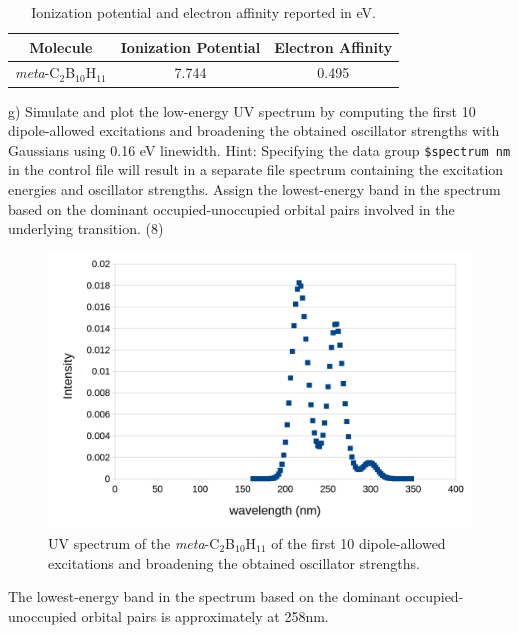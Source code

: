 \documentclass{article}
\begin{document}
\begin{table}[H]
  \centering
  \caption{Ionization potential and electron affinity
    reported in eV.}
  \begin{tabular}{ccc}
    Molecule & Ionization Potential & Electron Affinity \\
    \hline
    \textit{meta}-C$_2$B$_{10}$H$_{11}$ & 7.744 & 0.495 \\
  \end{tabular}
  \label{tab:ip_affinity}
\end{table}


\noindent g) Simulate and plot the low-energy UV spectrum by computing the
first 10 dipole-allowed excitations and broadening the obtained oscillator
strengths with Gaussians using 0.16 eV linewidth. Hint: Specifying the data
group \texttt{\$spectrum nm} in the control file will result in a separate file spectrum
containing the excitation energies and oscillator strengths. Assign the
lowest-energy band in the spectrum based on the dominant occupied-unoccupied
orbital pairs involved in the underlying transition. (8)

\begin{figure}[H]
  \centering
  \includegraphics[scale=0.5]{uv_spec.png}
  \caption{UV spectrum of the \textit{meta}-C$_2$B$_{10}$H$_{11}$ of the
    first 10 dipole-allowed excitations and broadening the obtained oscillator
    strengths.}
  \label{fig:spec}
\end{figure}

{\color{blue} The lowest-energy band in the spectrum based on the dominant
  occupied-unoccupied orbital pairs is approximately at 258nm.
}
\end{document}
